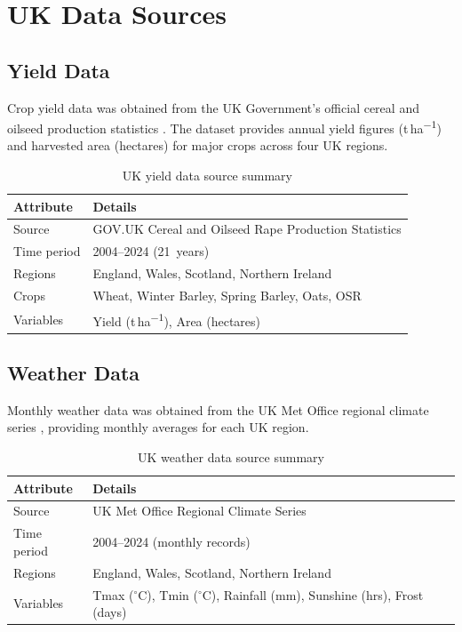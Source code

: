 \documentclass[12pt,a4paper]{report}
\newcommand{\degrees}{$^{\circ}$C}
\newcommand{\tha}{t\,ha\textsuperscript{$-1$}}
\begin{document}
\section{UK Data Sources}

\subsection{Yield Data}

Crop yield data was obtained from the UK Government's official cereal and oilseed production statistics \citep{defra2024}. The dataset provides annual yield figures (\tha{}) and harvested area (hectares) for major crops across four UK regions.

\begin{table}[H]
\centering
\caption{UK yield data source summary}
\label{tab:uk_yield_source}
\begin{tabular}{ll}
\toprule
\textbf{Attribute} & \textbf{Details} \\
\midrule
Source & GOV.UK Cereal and Oilseed Rape Production Statistics \\
Time period & 2004--2024 (21~years) \\
Regions & England, Wales, Scotland, Northern Ireland \\
Crops & Wheat, Winter Barley, Spring Barley, Oats, OSR \\
Variables & Yield (\tha{}), Area (hectares) \\
\bottomrule
\end{tabular}
\end{table}

\subsection{Weather Data}

Monthly weather data was obtained from the UK Met Office regional climate series \citep{metoffice2024}, providing monthly averages for each UK region.

\begin{table}[H]
\centering
\caption{UK weather data source summary}
\label{tab:uk_weather_source}
\begin{tabular}{ll}
\toprule
\textbf{Attribute} & \textbf{Details} \\
\midrule
Source & UK Met Office Regional Climate Series \\
Time period & 2004--2024 (monthly records) \\
Regions & England, Wales, Scotland, Northern Ireland \\
Variables & Tmax (\degrees{}), Tmin (\degrees{}), Rainfall (mm), Sunshine (hrs), Frost (days) \\
\bottomrule
\end{tabular}
\end{table}
\end{document}
